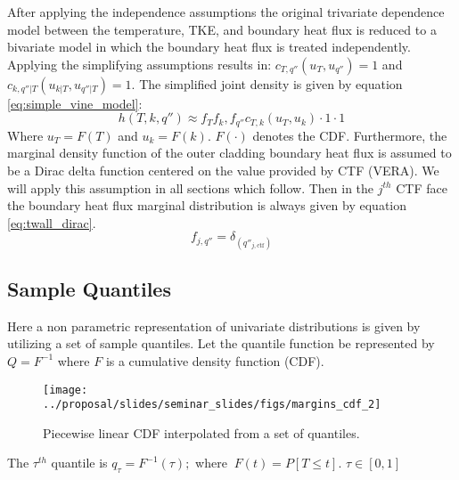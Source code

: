 After applying the independence assumptions the original trivariate dependence model between the temperature, TKE, and boundary heat flux is reduced to a bivariate model in which the boundary heat flux is treated independently.  Applying the simplifying assumptions results in: $c_{T,q''}(u_T, u_{q''}) = 1$ and $c_{k,q''|T}(u_{k|T}, u_{q''|T}) = 1$. The simplified joint density is given by equation \ref{eq:simple_vine_model}:
\begin{equation}
h(T, k, q'') \approx  f_T f_k, f_{q''} c_{T,k}(u_{T}, u_{k})  \cdot 1 \cdot 1
\label{eq:simple_vine_model}
\end{equation}
Where $u_T=F(T)$ and $u_k = F(k)$. $F(\cdot)$ denotes the CDF.
Furthermore, the marginal density function of the outer cladding boundary heat flux is assumed to be a Dirac delta function centered on the value provided by CTF (VERA).  We will apply this assumption in all sections which follow.
Then in the $j^{th}$ CTF face the boundary heat flux marginal distribution is always given by equation \ref{eq:twall_dirac}.
\begin{equation}
f_{j,q''} = \delta_{(q''_{j, \mathrm{ctf}})}
\label{eq:twall_dirac}
\end{equation}





\subsection{Sample Quantiles}
\label{chap:quantiles}

Here a non parametric representation of univariate distributions is given by utilizing a set of sample quantiles.  
Let the quantile function be represented by $Q=F^{-1}$ where $F$ is a cumulative density function (CDF).

\begin{figure}[H]
    \centering
    \texttt{[image: ../proposal/slides/seminar\_slides/figs/margins\_cdf\_2]}
    \caption[CDF from quantiles.]{Piecewise linear CDF interpolated from a set of quantiles.}
    \label{fig:marginscdf2}
\end{figure}

The $\tau^{th}$ quantile is $q_\tau = F^{-1}(\tau); $ where $\ F(t)=P[T \leq t]$.
$\tau \in [0, 1]$

